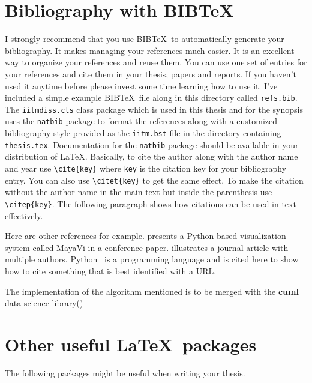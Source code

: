  \section{Bibliography with BIB\TeX}
 
 I strongly recommend that you use BIB\TeX\ to automatically generate
 your bibliography.  It makes managing your references much easier.  It
 is an excellent way to organize your references and reuse them.  You
 can use one set of entries for your references and cite them in your
 thesis, papers and reports.  If you haven't used it anytime before
 please invest some time learning how to use it.  
 I've included a simple example BIB\TeX\ file along in this directory
called \verb+refs.bib+.  The \verb+iitmdiss.cls+ class package which
 is used in this thesis and for the synopsis uses the \verb+natbib+
 package to format the references along with a customized bibliography
 style provided as the \verb+iitm.bst+ file in the directory containing
 \verb+thesis.tex+.  Documentation for the \verb+natbib+ package should
 be available in your distribution of \LaTeX.  Basically, to cite the
 author along with the author name and year use \verb+\cite{key}+ where
 \verb+key+ is the citation key for your bibliography entry.  You can
 also use \verb+\citet{key}+ to get the same effect.  To make the
 citation without the author name in the main text but inside the
 parenthesis use \verb+\citep{key}+.  The following paragraph shows how
 citations can be used in text effectively.
 
Here are other references for example.  \citet{viz:mayavi} presents a
Python based visualization system called MayaVi in a conference paper.
\citet{pan:pr:flat-fst} illustrates a journal article with multiple
authors.  Python~\citep{py:python} is a programming language and is
cited here to show how to cite something that is best identified with
a URL. 

The implementation of the algorithm mentioned is to be merged with the \textbf{cuml} data science library(\cite{raschka2020machine})

 
 \section{Other useful \LaTeX\ packages}
 
 The following packages might be useful when writing your thesis.
 
